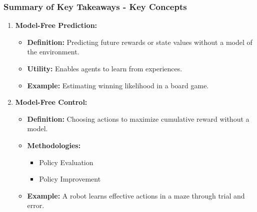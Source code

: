 \documentclass[aspectratio=169]{beamer}
\begin{document}
\begin{frame}[fragile]
    \frametitle{Summary of Key Takeaways - Key Concepts}
    \begin{enumerate}
        \item \textbf{Model-Free Prediction:}
            \begin{itemize}
                \item \textbf{Definition:} Predicting future rewards or state values without a model of the environment.
                \item \textbf{Utility:} Enables agents to learn from experiences.
                \item \textbf{Example:} Estimating winning likelihood in a board game.
            \end{itemize}
            
        \item \textbf{Model-Free Control:}
            \begin{itemize}
                \item \textbf{Definition:} Choosing actions to maximize cumulative reward without a model.
                \item \textbf{Methodologies:}
                    \begin{itemize}
                        \item Policy Evaluation
                        \item Policy Improvement
                    \end{itemize}
                \item \textbf{Example:} A robot learns effective actions in a maze through trial and error.
            \end{itemize}
    \end{enumerate}
\end{frame}
\end{document}
